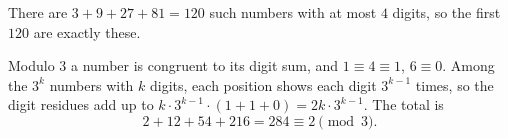 There are $3+9+27+81=120$ such numbers with at most $4$ digits, so the first $120$ are exactly these.

Modulo $3$ a number is congruent to its digit sum, and $1\equiv4\equiv1$, $6\equiv0$. Among the $3^k$ numbers with $k$ digits, each position shows each digit $3^{k-1}$ times, so the digit residues add up to $k\cdot3^{k-1}\cdot(1+1+0)=2k\cdot3^{k-1}$. The total is
\[2+12+54+216=284\equiv\boxed{2}\pmod3.\]
